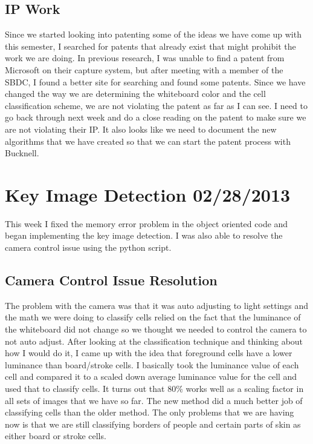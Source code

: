 \documentclass[]{article}
\begin{document}
		\subsection{IP Work}
			Since we started looking into patenting some of the ideas we have come up with this semester, I searched for patents that already exist that might prohibit the work we are doing. In previous research, I was unable to find a patent from Microsoft on their capture system, but after meeting with a member of the SBDC, I found a better site for searching and found some patents. Since we have changed the way we are determining the whiteboard color and the cell classification scheme, we are not violating the patent as far as I can see. I need to go back through next week and do a close reading on the patent to make sure we are not violating their IP. It also looks like we need to document the new algorithms that we have created so that we can start the patent process with Bucknell. 
	
	\section{Key Image Detection 02/28/2013}
		This week I fixed the memory error problem in the object oriented code and began implementing the key image detection. I was also able to resolve the camera control issue using the python script.
		
		\subsection{Camera Control Issue Resolution}
			The problem with the camera was that it was auto adjusting to light settings and the math we were doing to classify cells relied on the fact that the luminance of the whiteboard did not change so we thought we needed to control the camera to not auto adjust. After looking at the classification technique and thinking about how I would do it, I came up with the idea that foreground cells have a lower luminance than board/stroke cells. I basically took the luminance value of each cell and compared it to a scaled down average luminance value for the cell and used that to classify cells. It turns out that 80\% works well as a scaling factor in all sets of images that we have so far. The new method did a much better job of classifying cells than the older method. The only problems that we are having now is that we are still classifying borders of people and certain parts of skin as either board or stroke cells.
			
\end{document}
